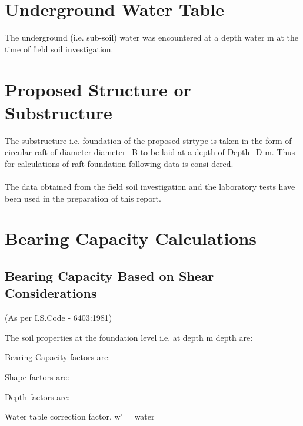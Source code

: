 \documentclass{set}
\begin{document}
\section{Underground Water Table}
The underground (i.e. sub-soil) water was encountered at a depth {{water}} m at the time of field soil
investigation.
\section{Proposed Structure or Substructure}
The  substructure i.e. foundation of the proposed {{strtype}} is taken in the form of circular raft of diameter {{diameter_B}} to be laid at a depth of   {{Depth_D}} m.  Thus for calculations of raft foundation following data is consi dered.\\

\\

The data obtained from the field soil investigation and the laboratory tests have been used in the
preparation of this report.
\section{Bearing Capacity Calculations}
\subsection{Bearing Capacity Based on Shear Considerations}
(As per I.S.Code - 6403:1981)\\


The soil properties at the foundation level i.e. at {{depth}} m depth are:\\


Bearing Capacity factors are:\\


Shape factors are:\\


Depth factors are:\\    


Water table correction factor, w' = {{water}}\\
\end{document}
